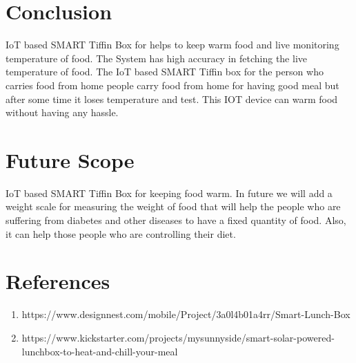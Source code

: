 \documentclass[conference]{IEEEtran}
\begin{document}
\section{Conclusion}
IoT based SMART Tiffin Box for helps to keep warm food and live monitoring temperature of food. The System has high accuracy in fetching the live temperature of food. The IoT based SMART Tiffin box for the person who carries food from home people carry food from home for having good meal but after some time it loses temperature and test. This IOT device can warm food without having any hassle. 


\section{Future Scope}
IoT based SMART Tiffin Box for keeping food warm. In future we will add a weight scale for measuring the weight of food that will help the people who are suffering from diabetes and other diseases to have a fixed quantity of food. Also, it can help those people who are controlling their diet.


\section{References}
\begin{enumerate}
    \item https://www.designnest.com/mobile/Project/3a0l4b01a4rr/Smart-Lunch-Box
    \item https://www.kickstarter.com/projects/mysunnyside/smart-solar-powered-lunchbox-to-heat-and-chill-your-meal
\end{enumerate}
  
\end{document}

